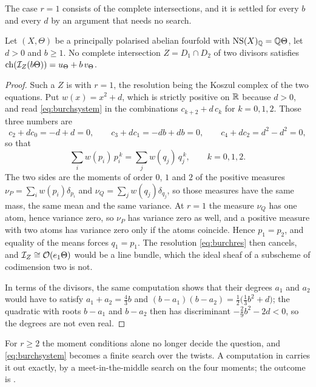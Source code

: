The case $r=1$ consists of the complete intersections, and it is settled for
every $b$ and every $d$ by an argument that needs no search.

\begin{theorem}%
\label{thm:noci}
Let $(X,\Theta)$ be a principally polarised abelian fourfold with
$\mathrm{NS}(X)_{\mathbb{Q}}=\mathbb{Q}\Theta$, let $d>0$ and $b\ge1$. No complete intersection
$Z=D_{1}\cap D_{2}$ of two divisors satisfies
$\operatorname{ch}(\mathcal{I}_{Z}(b\Theta))=u_{\Theta}+b\,v_{\Theta}$.
\end{theorem}

\begin{proof}
Such a $Z$ is  with $r=1$, the resolution being the Koszul
complex of the two equations. Put $w(x)=x^{2}+d$, which is strictly positive
on $\mathbb{R}$ because $d>0$, and read \eqref{eq:burchsystem} in the combinations
$c_{k+2}+d\,c_{k}$ for $k=0,1,2$. Those three numbers are
\[
  c_{2}+dc_{0}=-d+d=0,\qquad
  c_{3}+dc_{1}=-db+db=0,\qquad
  c_{4}+dc_{2}=d^{2}-d^{2}=0,
\]
so that
\[
  \sum_{i}w(p_{i})\,p_{i}^{\,k}=\sum_{j}w(q_{j})\,q_{j}^{\,k},
  \qquad k=0,1,2 .
\]
The two sides are the moments of order $0$, $1$ and $2$ of the positive
measures $\nu_{P}=\sum_{i}w(p_{i})\delta_{p_{i}}$ and
$\nu_{Q}=\sum_{j}w(q_{j})\delta_{q_{j}}$, so those measures have the same
mass, the same mean and the same variance. At $r=1$ the measure $\nu_{Q}$ has
one atom, hence variance zero, so $\nu_{P}$ has variance zero as well, and a
positive measure with two atoms has variance zero only if the atoms coincide.
Hence $p_{1}=p_{2}$, and equality of the means forces $q_{1}=p_{1}$. The
resolution \eqref{eq:burchres} then cancels, and $\mathcal{I}_{Z}\cong\mathcal{O}(e_{1}\Theta)$
would be a line bundle, which the ideal sheaf of a subscheme of codimension
two is not.

In terms of the divisors, the same computation shows that their degrees
$a_{1}$ and $a_{2}$ would have to satisfy $a_{1}+a_{2}=\tfrac43b$ and
$(b-a_{1})(b-a_{2})=\tfrac12\bigl(\tfrac13b^{2}+d\bigr)$; the quadratic with
roots $b-a_{1}$ and $b-a_{2}$ then has discriminant $-\tfrac29b^{2}-2d<0$, so
the degrees are not even real.
\end{proof}

For $r\ge2$ the moment conditions alone no longer decide the question, and
\eqref{eq:burchsystem} becomes a finite search over the twists. A computation in \cite{BMB26} carries it out exactly, by a meet-in-the-middle
search on the four moments; the outcome is .

